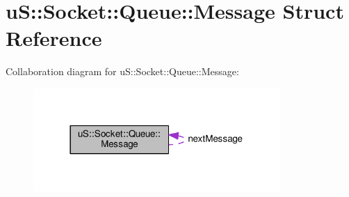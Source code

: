 \hypertarget{structu_s_1_1_socket_1_1_queue_1_1_message}{}\section{uS\+:\+:Socket\+:\+:Queue\+:\+:Message Struct Reference}
\label{structu_s_1_1_socket_1_1_queue_1_1_message}


Collaboration diagram for uS\+:\+:Socket\+:\+:Queue\+:\+:Message\+:
\nopagebreak
\begin{figure}[H]
\begin{center}
\leavevmode
\includegraphics[width=266pt]{structu_s_1_1_socket_1_1_queue_1_1_message__coll__graph}
\end{center}
\end{figure}
